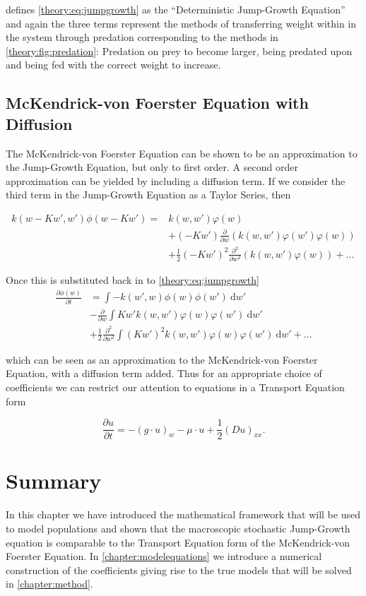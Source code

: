\documentclass[../main.tex]{subfiles}
\begin{document}
  \cite{datta2010} defines \autoref{theory:eq:jumpgrowth} as the ``Deterministic Jump-Growth Equation'' and again the three terms represent the methods of transferring weight within in the system through predation corresponding to the methods in \autoref{theory:fig:predation}: Predation on prey to become larger, being predated upon and being fed with the correct weight to increase.

  \subsection{McKendrick-von Foerster Equation with Diffusion}\label{theory:sec:mvfdiffusion}
  The McKendrick-von Foerster Equation can be shown to be an approximation to the Jump-Growth Equation, but only to first order. A second order approximation can be yielded by including a diffusion term. If we consider the third term in the Jump-Growth Equation as a Taylor Series, then

  \begin{align}
    k(w - Kw', w')\phi(w - K w')
    = & k(w, w') \varphi(w) \nonumber \\
      & + (-K w') \frac{\partial}{\partial w} \left(k(w, w')\varphi(w')\varphi(w)\right) \nonumber \\
      & + \frac{1}{2}(-K w')^2 \frac{\partial^2}{\partial w^2} \left(k(w, w')\varphi(w)\right) + ...
  \end{align}

  Once this is substituted back in to \autoref{theory:eq:jumpgrowth}
  \begin{align}\label{theory:eq:jumpdiffusion}
    \frac{\partial \phi(w)}{\partial t}
    & = \int - k(w', w) \phi(w)\phi(w')  \: \mathrm{d}w' \nonumber \\
    & - \frac{\partial}{\partial w} \int K w' k(w, w')\varphi(w)\varphi(w') \: \mathrm{d}w' \nonumber \\
    & + \frac{1}{2}\frac{\partial^2}{\partial w^2} \int (K w')^2 k(w, w')\varphi(w)\varphi(w') \: \mathrm{d}w' + ...
  \end{align}

  which can be seen as an approximation to the McKendrick-von Foerster Equation, with a diffusion term added. Thus for an appropriate choice of coefficients we can restrict our attention to equations in a Transport Equation form

  \begin{equation}\label{theory:eq:jumptransport}
    \frac{\partial u}{\partial t} = - (g \cdot u)_w - \mu \cdot u + \frac{1}{2}(D u)_{xx}.
  \end{equation}

  \section{Summary}
  In this chapter we have introduced the mathematical framework that will be used to model populations and shown that the macroscopic stochastic Jump-Growth equation is comparable to the Transport Equation form of the McKendrick-von Foerster Equation. In \autoref{chapter:modelequations} we introduce a numerical construction of the coefficients giving rise to the true models that will be solved in \autoref{chapter:method}.
\end{document}

